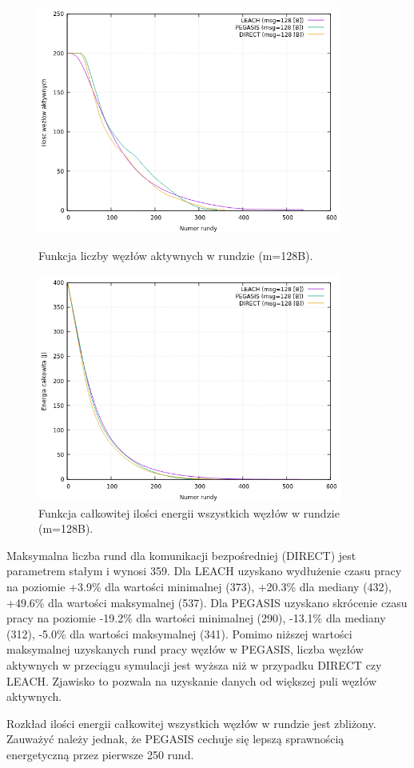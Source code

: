 \documentclass[a4paper,12pt,twoside,openany]{report}
\begin{document}
\begin{figure}[H]
 \centering
 \includegraphics[width=10cm]{images/gnuplot/test_1/nodes_in_round_m128.png}
 \caption{Funkcja liczby węzłów aktywnych w rundzie (m=128B).}
 \includegraphics[width=10cm]{images/gnuplot/test_1/energy_in_round_m128.png}
 \caption{Funkcja całkowitej ilości energii wszystkich węzłów w rundzie (m=128B).}
\end{figure}

\par
Maksymalna liczba rund dla komunikacji bezpośredniej (DIRECT) jest parametrem stałym i wynosi 359.
Dla LEACH uzyskano wydłużenie czasu pracy na poziomie +3.9\% dla wartości minimalnej (373), +20.3\% dla mediany (432), +49.6\% dla wartości maksymalnej (537).
Dla PEGASIS uzyskano skrócenie czasu pracy na poziomie -19.2\% dla wartości minimalnej (290), -13.1\% dla mediany (312), -5.0\% dla wartości maksymalnej (341).
Pomimo niższej wartości maksymalnej uzyskanych rund pracy węzłów w PEGASIS, liczba węzłów aktywnych w przeciągu symulacji jest wyższa niż w przypadku DIRECT czy LEACH.
Zjawisko to pozwala na uzyskanie danych od większej puli węzłów aktywnych.
\par
Rozkład ilości energii całkowitej wszystkich węzłów w rundzie jest zbliżony.
Zauważyć należy jednak, że PEGASIS cechuje się lepszą sprawnością energetyczną przez pierwsze 250 rund.
\end{document}
